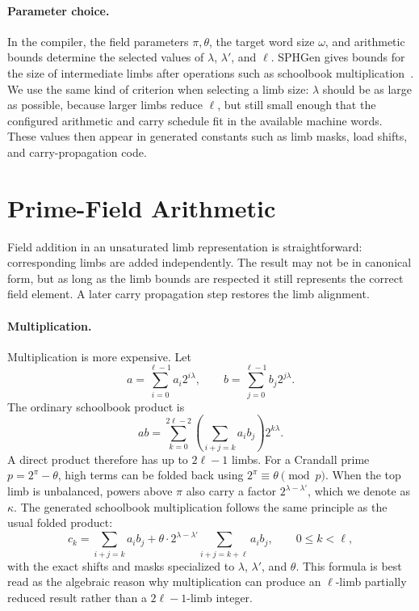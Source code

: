 \paragraph{Parameter choice.}
In the compiler, the field parameters \(\pi,\theta\), the target word size \(\omega\), and arithmetic bounds determine the selected values of \(\lambda\), \(\lambda'\), and \(\ell\). SPHGen gives bounds for the size of intermediate limbs after operations such as schoolbook multiplication~\cite{pegolotti2026sphgen}. We use the same kind of criterion when selecting a limb size: \(\lambda\) should be as large as possible, because larger limbs reduce \(\ell\), but still small enough that the configured arithmetic and carry schedule fit in the available machine words. These values then appear in generated constants such as limb masks, load shifts, and carry-propagation code.

\section{Prime-Field Arithmetic}
\label{sec:prime-field-arithmetic}

Field addition in an unsaturated limb representation is straightforward: corresponding limbs are added independently. The result may not be in canonical form, but as long as the limb bounds are respected it still represents the correct field element. A later carry propagation step restores the limb alignment.

\paragraph{Multiplication.}
Multiplication is more expensive. Let
\[
    a=\sum_{i=0}^{\ell-1} a_i 2^{i\lambda},
    \qquad
    b=\sum_{j=0}^{\ell-1} b_j 2^{j\lambda}.
\]
The ordinary schoolbook product is
\[
    ab = \sum_{k=0}^{2\ell-2}
             \left(\sum_{i+j=k} a_i b_j\right)2^{k\lambda}.
\]
A direct product therefore has up to \(2\ell-1\) limbs. For a Crandall prime \(p=2^\pi-\theta\), high terms can be folded back using \(2^\pi \equiv \theta \pmod p\). When the top limb is unbalanced, powers above \(\pi\) also carry a factor \(2^{\lambda-\lambda'}\), which we denote as \(\kappa\). The generated schoolbook multiplication follows the same principle as the usual folded product:
\[
    c_k =
      \sum_{i+j=k} a_i b_j
      +
      \theta \cdot 2^{\lambda-\lambda'}
      \sum_{i+j=k+\ell} a_i b_j,
      \qquad 0 \leq k < \ell,
\]
with the exact shifts and masks specialized to \(\lambda\), \(\lambda'\), and \(\theta\). This formula is best read as the algebraic reason why multiplication can produce an \(\ell\)-limb partially reduced result rather than a \(2\ell-1\)-limb integer.

